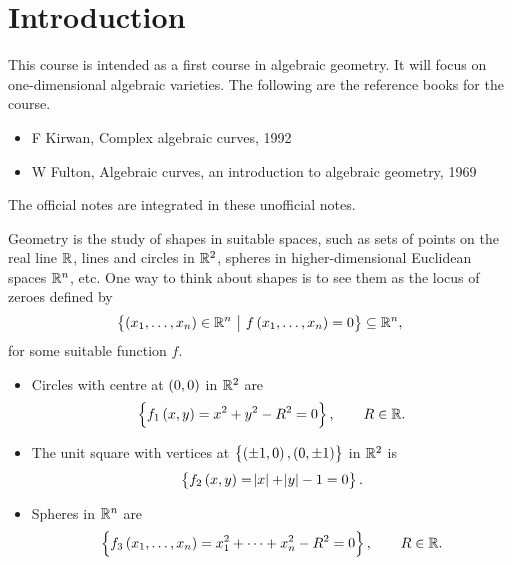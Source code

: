 \def\syllabus{Affine plane algebraic curves. Projective space. Plane projective curves. Projectivisation. Points at infinity. Singularities. Smoothness. Intersections of plane curves. Resultants. Multiplicities. B\'ezout's theorem. Conics. Cubic curves. Riemann surfaces. Genus. Ramification. The Riemann-Hurwitz formula. The degree-genus formula.}
\def\thm{section}







\setcounter{section}{0}

\section{Introduction}


This course is intended as a first course in algebraic geometry. It will focus on one-dimensional algebraic varieties. The following are the reference books for the course.
\begin{itemize}
\item F Kirwan, Complex algebraic curves, 1992
\item W Fulton, Algebraic curves, an introduction to algebraic geometry, 1969
\end{itemize}

\begin{note*}
The official notes are integrated in these unofficial notes.
\end{note*}

Geometry is the study of shapes in suitable spaces, such as sets of points on the real line $ \mathbb{R} $, lines and circles in $ \mathbb{R}^2 $, spheres in higher-dimensional Euclidean spaces $ \mathbb{R}^n $, etc. One way to think about shapes is to see them as the locus of zeroes defined by
$$ \cbr{\br{x_1, \dots, x_n} \in \RR^n \st f\br{x_1, \dots, x_n} = 0} \subseteq \RR^n, $$
for some suitable function $ f $.

\begin{example}
\label{eg:1.1}
\hfill
\begin{itemize}
\item Circles with centre at $ \br{0, 0} $ in $ \mathbb{R}^2 $ are
$$ \cbr{f_1\br{x, y} = x^2 + y^2 - R^2 = 0}, \qquad R \in \RR. $$
\item The unit square with vertices at $ \cbr{\br{\pm 1, 0}, \br{0, \pm 1}} $ in $ \mathbb{R}^2 $ is
$$ \cbr{f_2\br{x, y} = \abs{x} + \abs{y} - 1 = 0}. $$
\item Spheres in $ \mathbb{R}^n $ are
$$ \cbr{f_3\br{x_1, \dots, x_n} = x_1^2 + \dots + x_n^2 - R^2 = 0}, \qquad R \in \RR. $$
\end{itemize}
\end{example}

